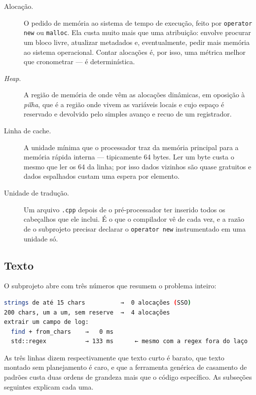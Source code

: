 \begin{description}
\item[Alocação.] O pedido de memória ao sistema de tempo de execução, feito por
\texttt{operator new} ou \texttt{malloc}. Ela custa muito mais que uma
atribuição: envolve procurar um bloco livre, atualizar metadados e,
eventualmente, pedir mais memória ao sistema operacional. Contar alocações é,
por isso, uma métrica melhor que cronometrar --- é determinística.
\item[\emph{Heap}.] A região de memória de onde vêm as alocações dinâmicas, em
oposição à \emph{pilha}, que é a região onde vivem as variáveis locais e cujo
espaço é reservado e devolvido pelo simples avanço e recuo de um registrador.
\item[Linha de cache.] A unidade mínima que o processador traz da memória
principal para a memória rápida interna --- tipicamente 64 bytes. Ler um byte
custa o mesmo que ler os 64 da linha; por isso dados vizinhos são quase
gratuitos e dados espalhados custam uma espera por elemento.
\item[Unidade de tradução.] Um arquivo \texttt{.cpp} depois de o
pré-processador ter inserido todos os cabeçalhos que ele inclui. É o que o
compilador vê de cada vez, e a razão de o subprojeto  precisar
declarar o \texttt{operator new} instrumentado em uma unidade só.
\end{description}

\subsection{Texto}
\label{sec:texto}

O subprojeto  abre com três números que resumem o problema
inteiro:

\begin{lstlisting}[style=bt, language=bash,
    caption={Saída de \texttt{src/strings/}: o resumo do subprojeto.}]
strings de até 15 chars          →  0 alocações (SSO)
200 chars, um a um, sem reserve  →  4 alocações
extrair um campo de log:
  find + from_chars    →   0 ms
  std::regex           → 133 ms      ← mesmo com a regex fora do laço
\end{lstlisting}

As três linhas dizem respectivamente que texto curto é barato, que texto montado
sem planejamento é caro, e que a ferramenta genérica de casamento de padrões
custa duas ordens de grandeza mais que o código específico. As subseções
seguintes explicam cada uma.

